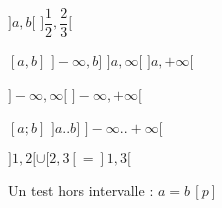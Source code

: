 \documentclass[varwidth, border = 3pt]{standalone}
\begin{document}
$]a, b[$
\quad
$]\dfrac{1}{2}, \dfrac{2}{3}[$

$[a, b]$
\quad
$]-\infty, b]$
\quad
$]a, \infty[$
\quad
$]a, +\infty[$

$]-\infty, \infty[$
\quad
$]-\infty, +\infty[$

$[a ; b]$
\quad
$]a .. b]$
\quad
$]-\infty .. +\infty[$

$]1, 2[ \cup [2, 3[ = ]1, 3[$

Un test hors intervalle : $a = b \, [p]$
\end{document}
